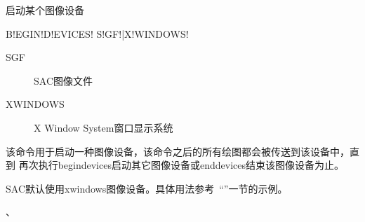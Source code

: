 \label{cmd:begindevices}

启动某个图像设备

\begin{SACSTX}
B!EGIN!D!EVICES! S!GF!|X!WINDOWS!
\end{SACSTX}

\begin{description}
\item [SGF] SAC图像文件
\item [XWINDOWS] X Window System窗口显示系统
\end{description}

该命令用于启动一种图像设备，该命令之后的所有绘图都会被传送到该设备中，直到
再次执行begindevices启动其它图像设备或enddevices结束该图像设备为止。

SAC默认使用xwindows图像设备。具体用法参考~``''一节的示例。

、
